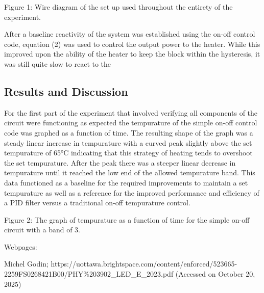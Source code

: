 \documentclass[11pt]{article}
\makeatletter
\newcommand{\boxspacing}{\kern\kvtcb@left@rule\kern\kvtcb@boxsep}
\newcommand{\prompt}[4]{
        {\ttfamily\llap{{\color{#2}[#3]:\hspace{3pt}#4}}\vspace{-\baselineskip}}
    }
\makeatother
\begin{document}
    Figure 1: Wire diagram of the set up used throughout the entirety of the
experiment.

    After a baseline reactivity of the system was established using the
on-off control code, equation (2) was used to control the output power
to the heater. While this improved upon the ability of the heater to
keep the block within the hysteresis, it was still quite slow to react
to the

    

    \hypertarget{results-and-discussion}{%
\subsection{Results and Discussion}\label{results-and-discussion}}

    For the first part of the experiment that involved verifying all
components of the circuit were functioning as expected the tempurature
of the simple on-off control code was graphed as a function of time. The
resulting shape of the graph was a steady linear increase in tempurature
with a curved peak slightly above the set tempurature of 65°C indicating
that this strategy of heating tends to overshoot the set tempurature.
After the peak there was a steeper linear decrease in tempurature until
it reached the low end of the allowed tempurature band. This data
functioned as a baseline for the required improvements to maintain a set
tempurature as well as a reference for the improved performance and
efficiency of a PID filter versus a traditional on-off tempurature
control.

    Figure 2: The graph of tempurature as a function of time for the simple
on-off circuit with a band of 3.

    

    

    

    Webpages:

Michel Godin;
https://uottawa.brightspace.com/content/enforced/523665-2259FS0268421B00/PHY\%203902\_LED\_E\_2023.pdf
(Accessed on October 20, 2025)

    \begin{tcolorbox}[breakable, size=fbox, boxrule=1pt, pad at break*=1mm,colback=cellbackground, colframe=cellborder]
\prompt{In}{incolor}{ }{\boxspacing}
\begin{Verbatim}[commandchars=\\\{\}]

\end{Verbatim}
\end{tcolorbox}


    
    
    
\end{document}
